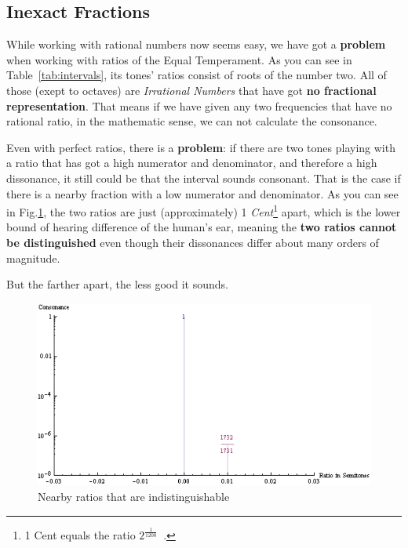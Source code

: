\documentclass[12pt,a4paper,titlepage,oneside]{report}
\begin{document}
\subsection{Inexact Fractions}
While working with rational numbers now seems easy, we have got a \textbf{problem} when working with ratios of the Equal Temperament. As you can see in Table~\ref{tab:intervals}, its tones' ratios consist of roots of the number two. All of those (exept to octaves) are \emph{Irrational Numbers} that have got \textbf{no fractional representation}. That means if we have given any two frequencies that have no rational ratio, in the mathematic sense, we can not calculate the consonance.

Even with perfect ratios, there is a \textbf{problem}: if there are two tones playing with a ratio that has got a high numerator and denominator, and therefore a high dissonance, it still could be that the interval sounds consonant. That is the case if there is a nearby fraction with a low numerator and denominator. As you can see in Fig.\ref{fig:enharmonic}, the two ratios are just (approximately) 1 \emph{Cent}\footnote{1 Cent equals the ratio $2^{\frac{1}{1200}}$~\cite{bib:cent}.} apart, which is the lower bound of hearing difference of the human's ear, meaning the \textbf{two ratios cannot be distinguished} even though their dissonances differ about many orders of magnitude.

\noindent
{}

But the farther apart, the less good it sounds.

\begin{figure}[!ht]
\includegraphics[width=\textwidth]{images/enharmonic.png}
\centering
\caption{Nearby ratios that are indistinguishable}
\label{fig:enharmonic}
\end{figure}
\end{document}
